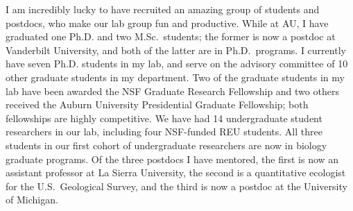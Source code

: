 I am incredibly lucky to have recruited an amazing group of students and
postdocs, who make
our lab group fun and productive.
While at AU, I have graduated one Ph.D. and two M.Sc.\ students;
the former is now a postdoc at Vanderbilt University,
and both of the latter are in Ph.D.\ programs.
I currently have seven Ph.D. students in my lab, and serve on the advisory
committee of 10 other graduate students in my department.
Two of the graduate students in my lab have been
awarded the NSF Graduate Research Fellowship and two others received the
Auburn University Presidential Graduate Fellowship;
both fellowships are highly competitive.
We have had 14 undergraduate student researchers in our lab, including four
NSF-funded REU students.
All three students in our first cohort of undergraduate researchers are now in
biology graduate programs.
Of the three postdocs I have mentored,
the first is now an assistant professor at La Sierra University, the second is
a quantitative ecologist for the U.S.\ Geological Survey, and the third is
now a postdoc at the University of Michigan.

